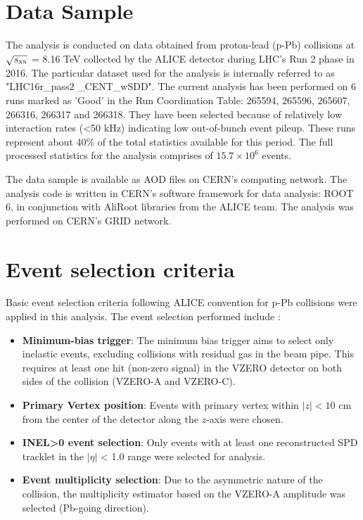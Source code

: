 \section{Data Sample}
The analysis is conducted on data obtained from proton-lead (p-Pb) collisions at $\sqrt{s_{\textnormal{\sc nn}}}$ = 8.16 TeV collected by the ALICE detector during
LHC's Run 2 phase in 2016. The particular dataset used for the analysis is internally referred to as "LHC16r\_pass2 \_CENT\_wSDD". The current analysis has been
performed on 6 runs marked as 'Good' in the Run Coordination Table: 265594, 265596, 265607, 266316, 266317 and 266318. They have been selected because of
relatively low interaction rates (<50 kHz) indicating low out-of-bunch event pileup. These runs represent about 40\% of the total statistics available for this
period. The full processed statistics for the analysis comprises of $15.7 \times 10^{6}$ events.

The data sample is available as AOD\cite{alirootAOD} files on CERN's computing network. The analysis code is written in CERN's software framework for data analysis: ROOT 6\cite{rootTutorial},
in conjunction with AliRoot\cite{aliRoot} libraries from the ALICE team. The analysis was performed on CERN's GRID network.

\section{Event selection criteria}

Basic event selection criteria following ALICE convention for p-Pb collisions\cite{aliceCuts} were applied in this analysis. The event selection performed include $\colon$

\begin{itemize}
    \item \textbf{Minimum-bias trigger}: The minimum bias trigger aims to select only inelastic events, excluding collisions with residual gas in the beam pipe.
          This requires at least one hit (non-zero signal) in the VZERO detector on both sides of the collision (VZERO-A and VZERO-C).
    \item \textbf{Primary Vertex position}: Events with primary vertex within $|z|<10$ cm from the center of the detector along the $z$-axis were chosen.
    \item \textbf{INEL>0 event selection}: Only events with at least one reconstructed SPD tracklet in the $|\eta|$ < 1.0 range were selected for analysis.
    \item \textbf{Event multiplicity selection}: Due to the asymmetric nature of the collision, the multiplicity estimator based on the VZERO-A amplitude was
          selected (Pb-going direction).
\end{itemize}


